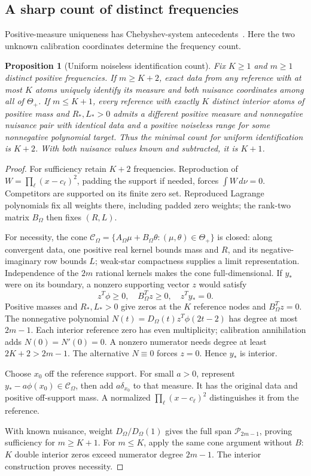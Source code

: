 \documentclass[10pt]{amsart}
\newtheorem{proposition}[theorem]{Proposition}
\theoremstyle{definition}
\theoremstyle{remark}
\theoremstyle{plain}
\newcommand{\ThetaAll}{\Theta_+}
\newcommand{\Pp}{\mathcal P}
\begin{document}
\subsection{A sharp count of distinct frequencies}\label{sec:frequencycount}
Positive-measure uniqueness has Chebyshev-system antecedents~\cite[Proposition~8]{eftekhari}. Here the two unknown calibration coordinates determine the frequency count.
\begin{proposition}[Uniform noiseless identification count]\label{prop:frequencycount}
Fix $K\ge1$ and $m\ge1$ distinct positive frequencies. If $m\ge K+2$, exact data from any reference with at most $K$ atoms uniquely identify its measure and both nuisance coordinates among all of $\ThetaAll$. If $m\le K+1$, every reference with exactly $K$ distinct interior atoms of positive mass and $R_*,L_*>0$ admits a different positive measure and nonnegative nuisance pair with identical data and a positive noiseless range for some nonnegative polynomial target. Thus the minimal count for uniform identification is $K+2$. With both nuisance values known and subtracted, it is $K+1$.
\end{proposition}
\begin{proof}
For sufficiency retain $K+2$ frequencies. Reproduction of $W=\prod_\ell(x-c_\ell)^2$, padding the support if needed, forces $\int W\,d\nu=0$. Competitors are supported on its finite zero set. Reproduced Lagrange polynomials fix all weights there, including padded zero weights; the rank-two matrix $B_\Omega$ then fixes $(R,L)$.

For necessity, the cone $\mathcal C_\Omega=\{A_\Omega\mu+B_\Omega\theta:(\mu,\theta)\in\ThetaAll\}$ is closed: along convergent data, one positive real kernel bounds mass and $R$, and its negative-imaginary row bounds $L$; weak-star compactness supplies a limit representation. Independence of the $2m$ rational kernels makes the cone full-dimensional. If $y_*$ were on its boundary, a nonzero supporting vector $z$ would satisfy
\[
 z^T\phi\ge0,\quad B_\Omega^Tz\ge0,\quad z^Ty_*=0.
\]
Positive masses and $R_*,L_*>0$ give zeros at the $K$ reference nodes and $B_\Omega^Tz=0$. The nonnegative polynomial $N(t)=D_\Omega(t)z^T\phi(2t-2)$ has degree at most $2m-1$. Each interior reference zero has even multiplicity; calibration annihilation adds $N(0)=N'(0)=0$. A nonzero numerator needs degree at least $2K+2>2m-1$. The alternative $N\equiv0$ forces $z=0$. Hence $y_*$ is interior.

Choose $x_0$ off the reference support. For small $a>0$, represent $y_*-a\phi(x_0)\in\mathcal C_\Omega$, then add $a\delta_{x_0}$ to that measure. It has the original data and positive off-support mass. A normalized $\prod_\ell(x-c_\ell)^2$ distinguishes it from the reference.

With known nuisance, weight $D_\Omega/D_\Omega(1)$ gives the full span $\Pp_{2m-1}$, proving sufficiency for $m\ge K+1$. For $m\le K$, apply the same cone argument without $B$: $K$ double interior zeros exceed numerator degree $2m-1$. The interior construction proves necessity.
\end{proof}
\end{document}
